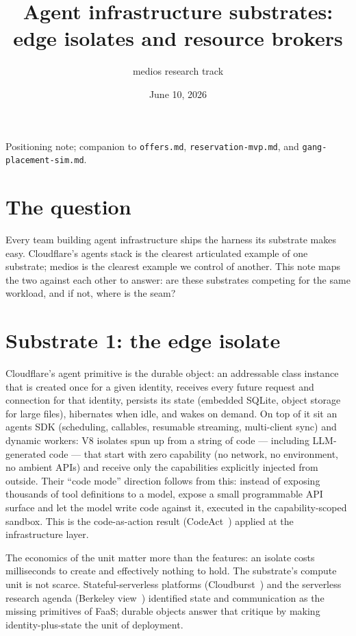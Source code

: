 \documentclass[11pt]{article}
\title{Agent infrastructure substrates:\\
edge isolates and resource brokers}
\author{medios research track}
\date{June 10, 2026}
\newcommand{\code}[1]{\texttt{#1}}
\begin{document}
\maketitle

\begin{center}
\small Positioning note; companion to \code{offers.md},
\code{reservation-mvp.md}, and \code{gang-placement-sim.md}.
\end{center}

\section{The question}

Every team building agent infrastructure ships the harness its substrate
makes easy. Cloudflare's agents stack is the clearest articulated example
of one substrate; medios is the clearest example we control of another.
This note maps the two against each other to answer: are these substrates
competing for the same workload, and if not, where is the seam?

\section{Substrate 1: the edge isolate}

Cloudflare's agent primitive is the durable object: an addressable class
instance that is created once for a given identity, receives every future
request and connection for that identity, persists its state (embedded
SQLite, object storage for large files), hibernates when idle, and wakes on
demand. On top of it sit an agents SDK (scheduling, callables, resumable
streaming, multi-client sync) and dynamic workers: V8 isolates spun up from
a string of code --- including LLM-generated code --- that start with zero
capability (no network, no environment, no ambient APIs) and receive only
the capabilities explicitly injected from outside. Their ``code mode''
direction follows from this: instead of exposing thousands of tool
definitions to a model, expose a small programmable API surface and let the
model write code against it, executed in the capability-scoped sandbox.
This is the code-as-action result (CodeAct~\cite{codeact}) applied at the
infrastructure layer.

The economics of the unit matter more than the features: an isolate costs
milliseconds to create and effectively nothing to hold. The substrate's
compute unit is not scarce. Stateful-serverless platforms
(Cloudburst~\cite{cloudburst}) and the serverless research agenda (Berkeley
view~\cite{berkeley}) identified state and communication as the missing
primitives of FaaS; durable objects answer that critique by making
identity-plus-state the unit of deployment.
\end{document}
